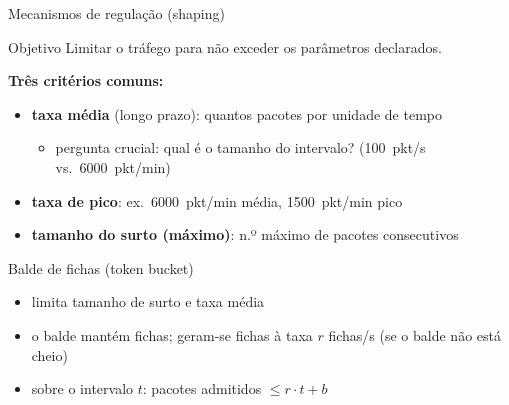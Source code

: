 \documentclass[aspectratio=169,11pt]{beamer}
\begin{document}
\begin{frame}{Mecanismos de regulação (shaping)}
  \begin{block}{Objetivo}
    Limitar o tráfego para não exceder os parâmetros declarados.
  \end{block}
  \textbf{Três critérios comuns:}
  \begin{itemize}
    \item \textbf{taxa média} (longo prazo): quantos pacotes por unidade de tempo
      \begin{itemize}
        \item pergunta crucial: qual é o tamanho do intervalo? (100~pkt/s vs.\ 6000~pkt/min)
      \end{itemize}
    \item \textbf{taxa de pico}: ex.\ 6000~pkt/min média, 1500~pkt/min pico
    \item \textbf{tamanho do surto (máximo)}: n.º máximo de pacotes consecutivos
  \end{itemize}
  \pause
  \begin{block}{Balde de fichas (token bucket)}
    \begin{itemize}
      \item limita tamanho de surto e taxa média
      \item o balde mantém fichas; geram-se fichas à taxa $r$ fichas/s (se o balde não está cheio)
      \item sobre o intervalo $t$: pacotes admitidos $\leq r\cdot t + b$
    \end{itemize}
  \end{block}
\end{frame}
\end{document}
